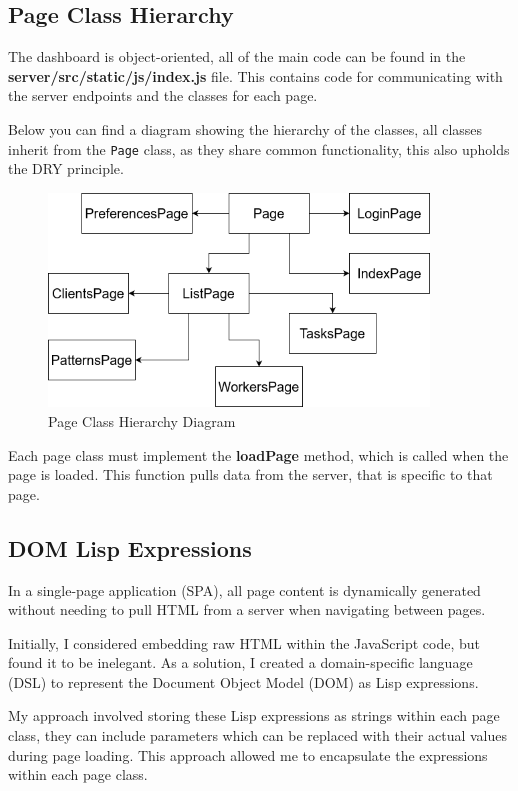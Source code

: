 \subsection {Page Class Hierarchy}
The dashboard is object-oriented,
all of the main code can be found in
the \textbf{server/src/static/js/index.js} file.
This contains code for communicating with
the server endpoints and the classes for each page.

Below you can find a diagram showing the hierarchy of the classes,
all classes inherit from the \texttt{Page} class,
as they share common functionality,
this also upholds the DRY principle.

\begin{figure}[h!]
    \includegraphics[width=0.9\textwidth]{images/diagrams/dashboard_hierarchy.drawio}
    \caption{Page Class Hierarchy Diagram}
    \label{image:sysArchitecture}
\end{figure}

Each page class must implement the \textbf{loadPage} method,
which is called when the page is loaded.
This function pulls data from the server,
that is specific to that page.

\subsection{DOM Lisp Expressions}
In a single-page application (SPA), all page content
is dynamically generated without
needing to pull HTML from a server when navigating between pages.

Initially, I considered embedding raw HTML within the JavaScript code,
but found it to be inelegant.
As a solution, I created a domain-specific language (DSL)
to represent the Document Object Model (DOM) as Lisp expressions.

My approach involved storing these Lisp expressions as strings within each page class,
they can include parameters which can be replaced
with their actual values during page loading.
This approach allowed me to encapsulate the expressions within each page class.

